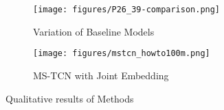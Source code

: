 \begin{figure*}[ht!]
\begin{center}
    \begin{minipage}[b]{1\textwidth}
        \begin{subfigure}[b]{0.475\textwidth}
            \centering
            \texttt{[image: figures/P26\_39-comparison.png]}
            \caption{Variation of Baseline Models}
            \label{fig:var_baseline}
        \end{subfigure}\quad
        \begin{subfigure}[b]{0.475\textwidth}
            \centering
            \texttt{[image: figures/mstcn\_howto100m.png]}
            \caption{MS-TCN with Joint Embedding}
            \label{fig:mstcn_joint}
        \end{subfigure}
        \caption{Qualitative results of Methods}
        \label{fig:baseline_qualitative}
    \end{minipage}
\end{center}
\end{figure*}


